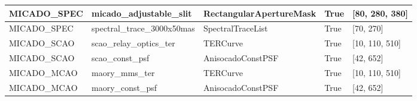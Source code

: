 \begin{longtable*}[c]{|p{0.191\DUtablewidth}|p{0.247\DUtablewidth}|p{0.238\DUtablewidth}|p{0.089\DUtablewidth}|p{0.191\DUtablewidth}|}
MICADO\_SPEC
 & 
micado\_adjustable\_slit
 & 
RectangularApertureMask
 & 
True
 & 
{[}80, 280, 380{]}
 \\
\hline

MICADO\_SPEC
 & 
spectral\_trace\_3000x50mas
 & 
SpectralTraceList
 & 
True
 & 
{[}70, 270{]}
 \\
\hline

MICADO\_SCAO
 & 
scao\_relay\_optics\_ter
 & 
TERCurve
 & 
True
 & 
{[}10, 110, 510{]}
 \\
\hline

MICADO\_SCAO
 & 
scao\_const\_psf
 & 
AnisocadoConstPSF
 & 
True
 & 
{[}42, 652{]}
 \\
\hline

MICADO\_MCAO
 & 
maory\_mms\_ter
 & 
TERCurve
 & 
True
 & 
{[}10, 110, 510{]}
 \\
\hline

MICADO\_MCAO
 & 
maory\_const\_psf
 & 
AnisocadoConstPSF
 & 
True
 & 
{[}42, 652{]}
 \\
\hline
\end{longtable*}
\label{tbl-effects-summary}
